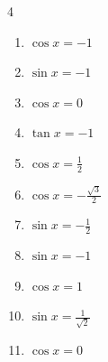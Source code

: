 \begin{multicols}{4}
\begin{enumerate}
        \phantom{$\displaystyle x = 0 , \pi$}

  \item $\displaystyle \cos{x}  = -1$

        \phantom{$\displaystyle x = \pi$}

\columnbreak %

\resetques

  \item $\displaystyle \sin{x}  = -1$


  \item $\displaystyle \cos{x}  = 0$


  \item $\displaystyle \tan{x}  = -1$


  \item $\displaystyle \cos{x}  = \frac{1}{2}$


  \item $\displaystyle \cos{x}  = -\frac{\sqrt{3}}{2}$


  \item $\displaystyle \sin{x}  = -\frac{1}{2}$


  \item $\displaystyle \sin{x}  = -1$


  \item $\displaystyle \cos{x}  = 1$

        \phantom{$\displaystyle x = 0$}

  \item $\displaystyle \sin{x}  = \frac{1}{\sqrt{2}}$


  \item $\displaystyle \cos{x}  = 0$



\end{enumerate}
\end{multicols}
